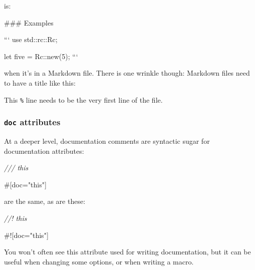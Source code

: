 \documentclass[a4paper,]{book}
\newenvironment{Shaded}{\begin{snugshade}}{\end{snugshade}}
\newcommand{\StringTok}[1]{\textcolor[rgb]{0.31,0.60,0.02}{{#1}}}
\newcommand{\CommentTok}[1]{\textcolor[rgb]{0.56,0.35,0.01}{\textit{{#1}}}}
\newcommand{\FunctionTok}[1]{\textcolor[rgb]{0.00,0.00,0.00}{{#1}}}
\newcommand{\AttributeTok}[1]{\textcolor[rgb]{0.77,0.63,0.00}{{#1}}}
\newcommand{\NormalTok}[1]{{#1}}
\begin{document}
is:

\begin{Shaded}
\begin{Highlighting}[]
\FunctionTok{### Examples}

\NormalTok{```}
\NormalTok{use std::rc::Rc;}

\NormalTok{let five = Rc::new(5);}
\NormalTok{```}
\end{Highlighting}
\end{Shaded}

when it's in a Markdown file. There is one wrinkle though: Markdown
files need to have a title like this:

\begin{Shaded}
\end{Shaded}

This \texttt{\%} line needs to be the very first line of the file.

\subsubsection{\texorpdfstring{\texttt{doc}
attributes}{doc attributes}}\label{doc-attributes}

At a deeper level, documentation comments are syntactic sugar for
documentation attributes:

\begin{Shaded}
\begin{Highlighting}[]
\CommentTok{/// this}

\AttributeTok{#[}\NormalTok{doc}\AttributeTok{=}\StringTok{"this"}\AttributeTok{]}
\end{Highlighting}
\end{Shaded}

are the same, as are these:

\begin{Shaded}
\begin{Highlighting}[]
\CommentTok{//! this}

\AttributeTok{#![}\NormalTok{doc}\AttributeTok{=}\StringTok{"this"}\AttributeTok{]}
\end{Highlighting}
\end{Shaded}

You won't often see this attribute used for writing documentation, but
it can be useful when changing some options, or when writing a macro.
\end{document}
